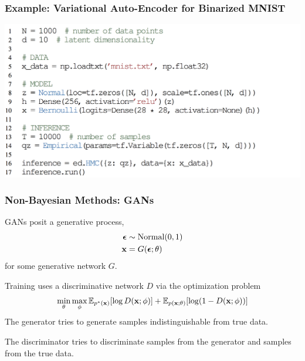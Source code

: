 \documentclass[10pt,
               xcolor={usenames,dvipsnames},
               hyperref={colorlinks,linktoc=all,citecolor=Plum,linkcolor=MidnightBlue,urlcolor=MidnightBlue},noamssymb]{beamer}
\begin{document}
\begin{frame}[t]
\frametitle{Example: Variational Auto-Encoder for Binarized MNIST}
\vspace{2.5ex}
\begin{center}
\includegraphics[width=1.05\textwidth]{img/vae_example_hmc.png}
\end{center}
\end{frame}

\begin{frame}
\frametitle{Non-Bayesian Methods: GANs}
GANs posit a generative process,
\begin{align*}
\boldsymbol{\mathbf{\epsilon}} &\sim \text{Normal}(0, 1) \\
\boldsymbol{\mathbf{x}} &= G(\boldsymbol{\mathbf{\epsilon}};\theta)
\end{align*}
for some generative network $G$.

Training uses a discriminative network $D$ via the
optimization problem
\begin{equation*}
\min_\theta \max_\phi
\mathbb{E}_{p^*(\boldsymbol{\mathbf{x}})} [ \log D(\boldsymbol{\mathbf{x}}; \phi) ]
+ \mathbb{E}_{p(\boldsymbol{\mathbf{x}}; \theta)} [ \log (1 - D(\boldsymbol{\mathbf{x}}; \phi)) ]
\end{equation*}
The generator tries to generate samples indistinguishable from true data.

The discriminator tries to discriminate samples from the generator and
samples from the true data.

\end{frame}
\end{document}
